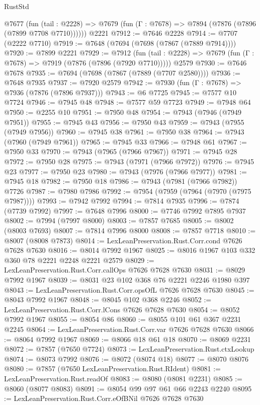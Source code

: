 \begin{lexlean}{RustStd}
\begin{coremodule}
{\begin{coremodule}
{{{{{{{{{{{{{{{{{{{{{{{{{{{{{{{{{{{{{{{{{{{{{{{{{{{{{    @7677
      (fun (tail : @2228) => @7679 (fun (Γ : @7678) => @7894 (@7876 (@7896 (@7899 @7708 @7710))))))
    @2221
@7912 := @7646 @2228
@7914 := @7707 (@2222 @7710)
@7919 := @7648 (@7694 (@7698 (@7867 (@7889 @7914))))
@7920 := @7899 @2221
@7929 := @7912
    (fun (tail : @2228) => @7679 (fun (Γ : @7678) => @7919 (@7876 (@7896 (@7920 @7710)))))
    @2579
@7930 := @7646 @7678
@7935 := @7694 (@7698 (@7867 (@7889 (@7707 @2580))))
@7936 := @7648 @7935
@7937 := @7920 @2579
@7942 := @7930 (fun (Γ : @7678) => @7936 (@7876 (@7896 @7937)))
@7943 := @6 @7725
@7945 := @7577 @10 @7724
@7946 := @7945 @48
@7948 := @7577 @59 @7723
@7949 := @7948 @64
@7950 := @2255 @10
@7951 := @7950 @48
@7954 := @7943 (@7946 (@7949 @7951))
@7955 := @7945 @43
@7956 := @7950 @43
@7959 := @7943 (@7955 (@7949 @7956))
@7960 := @7945 @38
@7961 := @7950 @38
@7964 := @7943 (@7960 (@7949 @7961))
@7965 := @7945 @33
@7966 := @7948 @61
@7967 := @7950 @33
@7970 := @7943 (@7965 (@7966 @7967))
@7971 := @7945 @28
@7972 := @7950 @28
@7975 := @7943 (@7971 (@7966 @7972))
@7976 := @7945 @23
@7977 := @7950 @23
@7980 := @7943 (@7976 (@7966 @7977))
@7981 := @7945 @18
@7982 := @7950 @18
@7986 := @7943 (@7981 (@7966 @7982)) @7726
@7987 := @7980 @7986
@7992 := @7954 (@7959 (@7964 (@7970 (@7975 @7987))))
@7993 := @7942 @7992
@7994 := @7814 @7935
@7996 := @7874 (@7739 @7992)
@7997 := @7648 @7996
@8000 := @7746 @7992 @7895 @7937
@8002 := @7994 (@7997 @8000)
@8003 := @7857 @7685
@8005 := @8002 (@8003 @7693)
@8007 := @7814 @7996 @8000
@8008 := @7857 @7718
@8010 := @8007 (@8008 @7873)
@8014 := LexLeanPreservation.Rust.Corr.cond @7626 @7628 @7630
@8016 := @8014 @7992 @1967
@8025 := @8016 @1967 @103 @332 @360 @78 @2221 @2248 @2221 @2579
@8029 := LexLeanPreservation.Rust.Corr.callOps @7626 @7628 @7630
@8031 := @8029 @7992 @1967
@8039 := @8031 @23 @102 @368 @76 @2221 @2246 @1980 @397
@8043 := LexLeanPreservation.Rust.Corr.opsOfL @7626 @7628 @7630
@8045 := @8043 @7992 @1967
@8048 := @8045 @102 @368 @2246
@8052 := LexLeanPreservation.Rust.Corr.lCons @7626 @7628 @7630
@8054 := @8052 @7992 @1967
@8055 := @8054 @86
@8060 := @8055 @101 @61 @367 @2231 @2245
@8064 := LexLeanPreservation.Rust.Corr.var @7626 @7628 @7630
@8066 := @8064 @7992 @1967
@8069 := @8066 @18 @61 @18
@8070 := @8069 @2231
@8072 := @7857 (@7650 @7724)
@8073 := LexLeanPreservation.Rust.ctxLookup
@8074 := @8073 @7992
@8076 := @8072 (@8074 @18)
@8077 := @8070 @8076
@8080 := @7857 (@7650 LexLeanPreservation.Rust.RIdent)
@8081 := LexLeanPreservation.Rust.readOf
@8083 := @8080 (@8081 @2231)
@8085 := @8060 (@8077 @8083)
@8091 := @8054 @99 @97 @61 @66 @2243 @2240
@8095 := LexLeanPreservation.Rust.Corr.eOfBNil @7626 @7628 @7630
}}}}}}}}}}}}}}}}}}}}}}}}}}}}}}}}}}}}}}}}}}}}}}}}}}}}}
\end{coremodule}}
\end{coremodule}
\end{lexlean}
